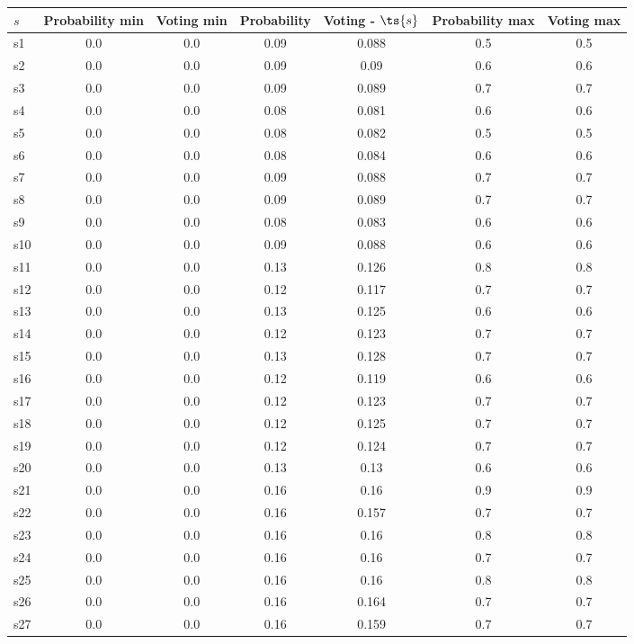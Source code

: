 \documentclass{article}
\begin{document}
\noindent\begin{tabular}{|l|c|c|c|c|c|c|}
\hline
$s$& Probability min & Voting min & Probability & Voting - $\ts{s}$ & Probability max & Voting max\\
\hline
s1 &0.0 & 0.0 & 0.09 & 0.088 & 0.5 & 0.5\\
\hline
s2 &0.0 & 0.0 & 0.09 & 0.09 & 0.6 & 0.6\\
\hline
s3 &0.0 & 0.0 & 0.09 & 0.089 & 0.7 & 0.7\\
\hline
s4 &0.0 & 0.0 & 0.08 & 0.081 & 0.6 & 0.6\\
\hline
s5 &0.0 & 0.0 & 0.08 & 0.082 & 0.5 & 0.5\\
\hline
s6 &0.0 & 0.0 & 0.08 & 0.084 & 0.6 & 0.6\\
\hline
s7 &0.0 & 0.0 & 0.09 & 0.088 & 0.7 & 0.7\\
\hline
s8 &0.0 & 0.0 & 0.09 & 0.089 & 0.7 & 0.7\\
\hline
s9 &0.0 & 0.0 & 0.08 & 0.083 & 0.6 & 0.6\\
\hline
s10 &0.0 & 0.0 & 0.09 & 0.088 & 0.6 & 0.6\\
\hline
s11 &0.0 & 0.0 & 0.13 & 0.126 & 0.8 & 0.8\\
\hline
s12 &0.0 & 0.0 & 0.12 & 0.117 & 0.7 & 0.7\\
\hline
s13 &0.0 & 0.0 & 0.13 & 0.125 & 0.6 & 0.6\\
\hline
s14 &0.0 & 0.0 & 0.12 & 0.123 & 0.7 & 0.7\\
\hline
s15 &0.0 & 0.0 & 0.13 & 0.128 & 0.7 & 0.7\\
\hline
s16 &0.0 & 0.0 & 0.12 & 0.119 & 0.6 & 0.6\\
\hline
s17 &0.0 & 0.0 & 0.12 & 0.123 & 0.7 & 0.7\\
\hline
s18 &0.0 & 0.0 & 0.12 & 0.125 & 0.7 & 0.7\\
\hline
s19 &0.0 & 0.0 & 0.12 & 0.124 & 0.7 & 0.7\\
\hline
s20 &0.0 & 0.0 & 0.13 & 0.13 & 0.6 & 0.6\\
\hline
s21 &0.0 & 0.0 & 0.16 & 0.16 & 0.9 & 0.9\\
\hline
s22 &0.0 & 0.0 & 0.16 & 0.157 & 0.7 & 0.7\\
\hline
s23 &0.0 & 0.0 & 0.16 & 0.16 & 0.8 & 0.8\\
\hline
s24 &0.0 & 0.0 & 0.16 & 0.16 & 0.7 & 0.7\\
\hline
s25 &0.0 & 0.0 & 0.16 & 0.16 & 0.8 & 0.8\\
\hline
s26 &0.0 & 0.0 & 0.16 & 0.164 & 0.7 & 0.7\\
\hline
s27 &0.0 & 0.0 & 0.16 & 0.159 & 0.7 & 0.7\\

\end{tabular}
\end{document}
